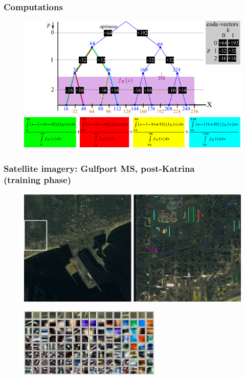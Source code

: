 \begin{frame}[plain]
\frametitle{Computations}
\logoCSIPCPL
	\begin{changemargin}{-1.3in}{0in}
		\begin{figure}				
			\includegraphics[width=1.0\textwidth]{figs/RVQ_stagewise_example2.pdf}
			\label{fig:RVQ_SQ_DMSE}
		\end{figure}
	\end{changemargin}
\end{frame}




\begin{frame}
\frametitle{\small Satellite imagery: Gulfport MS, post-Katrina \\(training phase)}
\logoCSIPCPL\mypagenum
	\begin{figure}		
		\includegraphics[width=1.0\textwidth]{figs/RVQ_SatelliteKatrina_1_snippets.png}			
	\end{figure}
	\begin{figure}		
		\includegraphics[width=0.6\textwidth]{figs/RVQ_SatelliteKatrina_2_codebooks.png}			
	\end{figure}
\end{frame}


